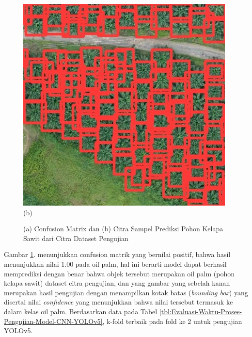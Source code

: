 \begin{figure}[H]
	\vspace{-0.1cm}
	\begin{center}
		\includegraphics[width=1\columnwidth]{bab4/Gambar/Picture29.2.jpg}
		(b)
	\end{center}
	\vspace{-0.2cm}
	\captionsetup{justification=centering}
	\caption{(a) Confusion Matrix dan (b) Citra Sampel Prediksi Pohon Kelapa Sawit dari Citra Dataset Pengujian}\label{img:Confusion-Matrix-dan-Citra-Sampel-Prediksi-Pohon-Kelapa}
\end{figure}

Gambar \ref{img:Confusion-Matrix-dan-Citra-Sampel-Prediksi-Pohon-Kelapa}. menunjukkan confusion matrik yang bernilai positif, bahwa hasil menunjukkan nilai 1.00 pada oil palm, hal ini berarti model dapat berhasil memprediksi dengan benar bahwa objek tersebut merupakan oil palm (pohon kelapa sawit) dataset citra  pengujian, dan yang gambar yang sebelah kanan merupakan hasil pengujian dengan menampilkan kotak batas (\textit{bounding box}) yang disertai nilai \textit{confidence} yang menunjukkan bahwa nilai tersebut termasuk ke dalam kelas oil palm. Berdasarkan data pada Tabel \ref{tbl:Evaluasi-Waktu-Proses-Pengujian-Model-CNN-YOLOv5}, k-fold terbaik pada fold ke 2 untuk pengujian YOLOv5.

